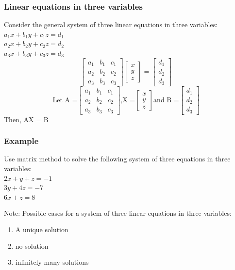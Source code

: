 \documentclass[
	11pt, %
]{beamer}
\begin{document}
\begin{frame}[t]
    \frametitle{Linear equations in three variables}
    Consider the general system of three linear equations in three variables:
    $a_1x + b_1y+ c_1z = d_1$\\
    $a_2x + b_2y+ c_2z = d_2$\\
    $a_3x + b_3y+ c_3z = d_3$
    \[
        \begin{bmatrix}
            a_1 & b_1 & c_1\\
            a_2 & b_2 & c_2\\
            a_3 & b_3 & c_3
        \end{bmatrix}
        \begin{bmatrix}
            x\\
            y\\
            z
        \end{bmatrix}
        =
        \begin{bmatrix}
            d_1\\
            d_2\\
            d_3
        \end{bmatrix}
    \]
    \[
        \text{Let A =} 
        \begin{bmatrix}
            a_1 & b_1 & c_1\\
            a_2 & b_2 & c_2\\
            a_3 & b_3 & c_3
        \end{bmatrix}
        \text{,X =}
        \begin{bmatrix}
            x\\
            y\\
            z
        \end{bmatrix}
        \text{and B =}
        \begin{bmatrix}
            d_1\\
            d_2\\
            d_3
        \end{bmatrix}
    \]    
    Then, AX = B
\end{frame}

\begin{frame}[t]
    \frametitle{Example}
    Use matrix method to solve the following system of three equations in three variables:\\
    $2x + y + z = -1$\\
    $3y + 4z = -7$\\
    $6x + z = 8$
\end{frame}
\begin{frame}[b]
    Note: Possible cases for a system of three linear equations in three variables:
    \begin{enumerate}
        \item A unique solution
        \item no solution
        \item infinitely many solutions
    \end{enumerate}    
\end{frame}
\end{document}
